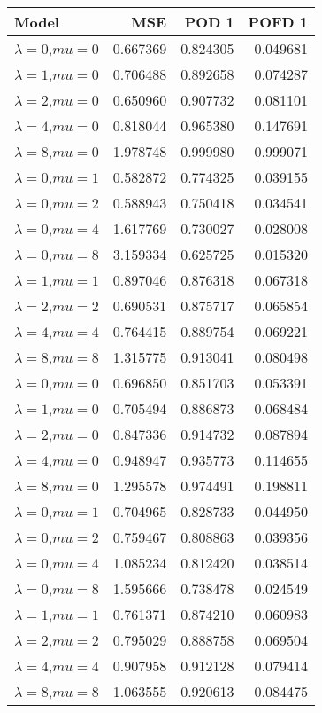 \begin{tabular}{lrrr}
\toprule
         Model &       MSE &     POD 1 &    POFD 1 \\
\midrule
$\lambda=0$,$mu=0$ &  0.667369 &  0.824305 &  0.049681 \\
$\lambda=1$,$mu=0$ &  0.706488 &  0.892658 &  0.074287 \\
$\lambda=2$,$mu=0$ &  0.650960 &  0.907732 &  0.081101 \\
$\lambda=4$,$mu=0$ &  0.818044 &  0.965380 &  0.147691 \\
$\lambda=8$,$mu=0$ &  1.978748 &  0.999980 &  0.999071 \\
$\lambda=0$,$mu=1$ &  0.582872 &  0.774325 &  0.039155 \\
$\lambda=0$,$mu=2$ &  0.588943 &  0.750418 &  0.034541 \\
$\lambda=0$,$mu=4$ &  1.617769 &  0.730027 &  0.028008 \\
$\lambda=0$,$mu=8$ &  3.159334 &  0.625725 &  0.015320 \\
$\lambda=1$,$mu=1$ &  0.897046 &  0.876318 &  0.067318 \\
$\lambda=2$,$mu=2$ &  0.690531 &  0.875717 &  0.065854 \\
$\lambda=4$,$mu=4$ &  0.764415 &  0.889754 &  0.069221 \\
$\lambda=8$,$mu=8$ &  1.315775 &  0.913041 &  0.080498 \\
$\lambda=0$,$mu=0$ &  0.696850 &  0.851703 &  0.053391 \\
$\lambda=1$,$mu=0$ &  0.705494 &  0.886873 &  0.068484 \\
$\lambda=2$,$mu=0$ &  0.847336 &  0.914732 &  0.087894 \\
$\lambda=4$,$mu=0$ &  0.948947 &  0.935773 &  0.114655 \\
$\lambda=8$,$mu=0$ &  1.295578 &  0.974491 &  0.198811 \\
$\lambda=0$,$mu=1$ &  0.704965 &  0.828733 &  0.044950 \\
$\lambda=0$,$mu=2$ &  0.759467 &  0.808863 &  0.039356 \\
$\lambda=0$,$mu=4$ &  1.085234 &  0.812420 &  0.038514 \\
$\lambda=0$,$mu=8$ &  1.595666 &  0.738478 &  0.024549 \\
$\lambda=1$,$mu=1$ &  0.761371 &  0.874210 &  0.060983 \\
$\lambda=2$,$mu=2$ &  0.795029 &  0.888758 &  0.069504 \\
$\lambda=4$,$mu=4$ &  0.907958 &  0.912128 &  0.079414 \\
$\lambda=8$,$mu=8$ &  1.063555 &  0.920613 &  0.084475 \\
\bottomrule
\end{tabular}
